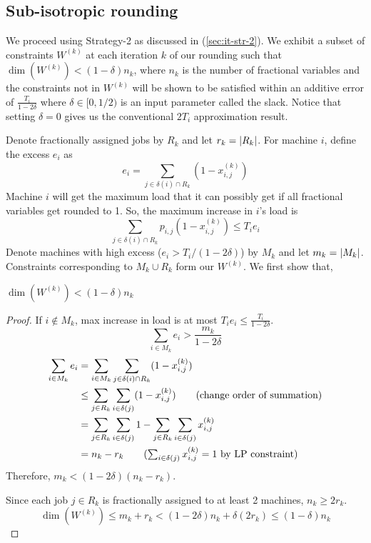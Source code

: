 \subsection{Sub-isotropic rounding}

We proceed using Strategy-2 as discussed in (\ref{sec:it-str-2}).
We exhibit a subset of constraints $W^{(k)}$ at each iteration $k$ of our rounding such that
$\dim(W^{(k)}) < (1-\delta)n_k$, where $n_k$ is the number of fractional variables
and the constraints not in $W^{(k)}$ will be shown to be satisfied
within an additive error of $\frac{T_i}{1-2\delta}$ where $\delta \in [0,1/2)$
is an input parameter called the slack.
Notice that setting $\delta = 0$ gives us the conventional $2T_i$ approximation result.

Denote fractionally assigned jobs by $R_k$ and let $r_k = \left\lvert R_k \right\rvert$.
For machine $i$, define the excess $e_i$ as
\[ e_i = \sum_{j \in \delta(i) \cap R_k} (1 - x_{i,j}^{(k)}) \]
Machine $i$ will get the maximum load that it can possibly get if
all fractional variables get rounded to 1. So, the maximum increase in $i$'s load is
\[ \sum_{j \in \delta(i) \cap R_k} p_{i,j} (1-x_{i,j}^{(k)}) \leq T_i e_i \]
Denote machines with high excess ($e_i > T_i/(1-2\delta)$) by $M_k$ and let $m_k = \left\lvert M_k \right\rvert$.
Constraints corresponding to $M_k \cup R_k$ form our $W^{(k)}$. We first show that,
\begin{lemma}
$\dim(W^{(k)}) < (1-\delta)n_k$
\end{lemma}
\begin{proof}
If $i \not\in M_k$, max increase in load is at most $T_i e_i \le \frac{T_i}{1-2\delta}$.
\[ \sum_{i \in M_k} e_i > \frac{m_k}{1-2\delta} \]
\begin{align*}
\sum_{i \in M_k} e_i
&= \sum_{i \in M_k} \sum_{j \in \delta(i) \cap R_k} (1 - x_{i,j}^{(k)})
\\ &\leq \sum_{j \in R_k} \sum_{i \in \delta(j)} (1 - x_{i,j}^{(k)})  \tag{change order of summation}
\\ &= \sum_{j \in R_k} \sum_{i \in \delta(j)} 1 - \sum_{j \in R_k} \sum_{i \in \delta(j)} x_{i,j}^{(k)}
\\ &= n_k - r_k \tag{$\sum_{i \in \delta(j)} x_{i,j}^{(k)} = 1$ by LP constraint}
\end{align*}
Therefore, $m_k < (1-2\delta)(n_k - r_k)$.

Since each job $j \in R_k$ is fractionally assigned to at least 2 machines, $n_k \geq 2r_k$.
\[ \dim(W^{(k)}) \le m_k + r_k < (1-2\delta)n_k + \delta(2r_k) \le (1-\delta)n_k \]
\end{proof}

